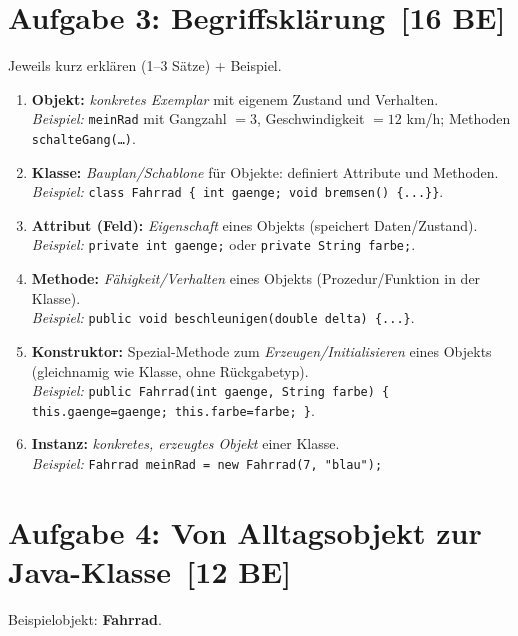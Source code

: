 \documentclass[11pt,a4paper]{scrartcl}
\begin{document}
	\section*{Aufgabe 3: Begriffsklärung \,[16 BE]}
	Jeweils kurz erklären (1–3 Sätze) + Beispiel.
	
	\begin{enumerate}[leftmargin=*,itemsep=0.6em]
		\item \textbf{Objekt:} \emph{konkretes Exemplar} mit eigenem Zustand und Verhalten.\\
		\emph{Beispiel:} \texttt{meinRad} mit Gangzahl \(=3\), Geschwindigkeit \(=12\) km/h; Methoden \texttt{schalteGang(…)}.
		
		\item \textbf{Klasse:} \emph{Bauplan/Schablone} für Objekte: definiert Attribute und Methoden.\\
		\emph{Beispiel:} \texttt{class Fahrrad \{ int gaenge; void bremsen() \{...\}\}}.
		
		\item \textbf{Attribut (Feld):} \emph{Eigenschaft} eines Objekts (speichert Daten/Zustand).\\
		\emph{Beispiel:} \texttt{private int gaenge;} oder \texttt{private String farbe;}.
		
		\item \textbf{Methode:} \emph{Fähigkeit/Verhalten} eines Objekts (Prozedur/Funktion in der Klasse).\\
		\emph{Beispiel:} \texttt{public void beschleunigen(double delta) \{...\}}.
		
		\item \textbf{Konstruktor:} Spezial-Methode zum \emph{Erzeugen/Initialisieren} eines Objekts (gleichnamig wie Klasse, ohne Rückgabetyp).\\
		\emph{Beispiel:} \texttt{public Fahrrad(int gaenge, String farbe) \{ this.gaenge=gaenge; this.farbe=farbe; \}}.
		
		\item \textbf{Instanz:} \emph{konkretes, erzeugtes Objekt} einer Klasse.\\
		\emph{Beispiel:} \texttt{Fahrrad meinRad = new Fahrrad(7, "blau");}
	\end{enumerate}
	
	\section*{Aufgabe 4: Von Alltagsobjekt zur Java-Klasse \,[12 BE]}
	Beispielobjekt: \textbf{Fahrrad}.
	
\end{document}

